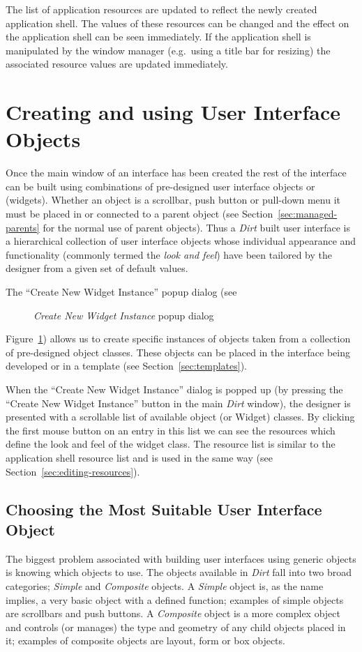 The list of application resources are updated to reflect the newly created
application shell.  The values of these resources can be changed and the effect
on the application shell can be seen immediately.  If the application shell
is manipulated by the window manager (e.g.\ using a title bar for resizing)
the associated resource values are updated immediately.

\section{Creating and using User Interface Objects}
Once the main window of an interface has been created the rest of
the interface can be built using combinations of pre-designed user interface
objects or (widgets).  Whether an object is a scrollbar, push button or
pull-down menu it must be placed in or connected to a parent object
(see Section~\ref{sec:managed-parents} for the
normal use of parent objects).  Thus a {\em Dirt} built user interface is a
hierarchical collection of user interface objects whose individual appearance
and functionality (commonly termed the {\em look and feel}) have been
tailored by the designer from a given set of default values.

The ``Create New Widget Instance'' popup dialog (see
\begin{figure}
\centerline{}
\caption{{\em Create New Widget Instance} popup dialog}
\label{fig:new-dialog-box}
\end{figure}
Figure~\ref{fig:new-dialog-box}) allows us to create specific instances of
objects taken from a collection of pre-designed object classes.  These
objects can be placed in the interface being developed or in a template
(see Section~\ref{sec:templates}).

When the ``Create New Widget Instance'' dialog is popped up (by pressing the
``Create New Widget Instance'' button in the main {\em Dirt} window), the
designer is presented with a scrollable list of available object (or Widget)
classes.  By clicking the first mouse button on an entry in this list we can
see the resources which define the look and feel of the widget class.
The resource list is similar to the application shell resource list and is
used in the same way (see Section~\ref{sec:editing-resources}).

\subsection{Choosing the Most Suitable User Interface Object}
The biggest problem associated with building user interfaces using generic
objects is knowing which objects to use.  The objects available in {\em Dirt}
fall into two broad categories; {\em Simple} and {\em Composite} objects.
A {\em Simple} object is, as the name implies, a very basic object with a
defined function; examples of simple objects are scrollbars and push buttons.
A {\em Composite} object is a more complex object and controls (or manages)
the type and geometry of any child objects placed in it; examples of composite
objects are layout, form or box objects.

